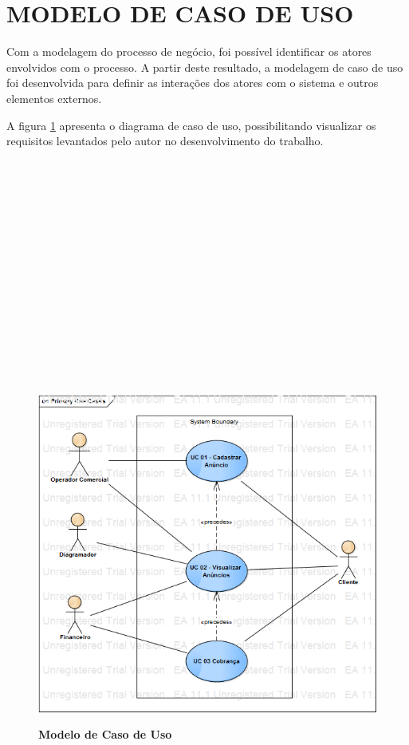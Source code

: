 \documentclass[
	12pt,				%
	openright,			%
	oneside,			%
	a4paper,			%
	chapter=TITLE,		%
	section=TITLE,		%
	english,			%
	french,				%
	spanish,			%
	brazil				%
	]{abntex2}
\begin{document}
\section{MODELO DE CASO DE USO}
Com a modelagem do processo de negócio, foi possível identificar os atores envolvidos com o processo. A partir deste resultado, a modelagem de caso de uso foi desenvolvida para definir as interações dos atores com o sistema e outros elementos externos.

A figura \ref{fig-modelo-uc} apresenta o diagrama de caso de uso, possibilitando visualizar os requisitos levantados pelo autor no desenvolvimento do trabalho. \\ \\ \\ \\ \\ \\ \\ \\ \\ \\ \\ \\ \\ \\ \\ \\


\begin{figure}[htb]
	\begin{center}
		\caption{
			\textbf{Modelo de Caso de Uso}
		}\label{fig-modelo-uc}
		\includegraphics [scale=0.5]{imagens/modelo_caso_de_uso.png}
		\label{fig-modelo-uc}
	\end{center}
\end{figure}
\end{document}
